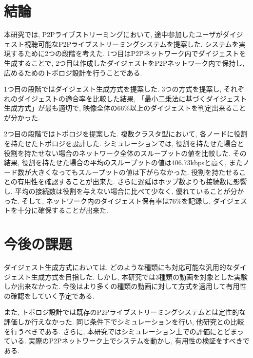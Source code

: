 \section{結論}
本研究では, P2Pライブストリーミングにおいて, 途中参加したユーザがダイジェスト視聴可能なP2Pライブストリーミングシステムを提案した. システムを実現するために2つの段階を考えた. 1つ目はP2Pネットワーク内でダイジェストを生成することで, 2つ目は作成したダイジェストをP2Pネットワーク内で保持し, 広めるためのトポロジ設計を行うことである.

1つ目の段階ではダイジェスト生成方式を提案した. 3つの方式を提案し, それぞれのダイジェストの適合率を比較した結果, 「最小二乗法に基づくダイジェスト生成方式」が最も適切で, 映像全体の66\%以上のダイジェストを判定出来ることが分かった.

2つ目の段階ではトポロジを提案した. 複数クラスタ型において, 各ノードに役割を持たせたトポロジを設計した. シミュレーションでは, 役割を持たせた場合と役割を持たせない場合のネットワーク全体のスループットの値を比較した. その結果, 役割を持たせた場合の平均のスループットの値は406.73kbpsと高く, またノード数が大きくなってもスループットの値は下がらなかった. 役割を持たせることの有用性を確認することが出来た. さらに遅延はホップ数よりも接続数に影響し, 平均の接続数は役割を与えない場合に比べて少なく, 優れていることが分かった. そして, ネットワーク内のダイジェスト保有率は76\%を記録し, ダイジェストを十分に確保することが出来た.

\section{今後の課題}
ダイジェスト生成方式においては, どのような種類にも対応可能な汎用的なダイジェスト生成方式を目指した. しかし, 本研究では3種類の動画を対象とした実験しか出来なかった. 今後はより多くの種類の動画に対して方式を適用して有用性の確認をしていく予定である.

また, トポロジ設計では既存のP2Pライブストリーミングシステムとは定性的な評価しか行えなかった. 同じ条件下でシミュレーションを行い, 他研究との比較を行うべきである. さらに, 本研究ではシミュレーション上での評価にとどまっている. 実際のP2Pネットワーク上でシステムを動かし, 有用性の検証をすべきである.

